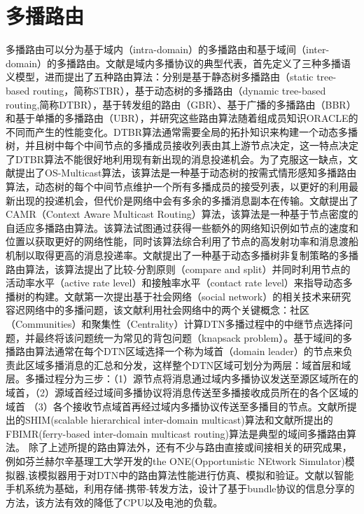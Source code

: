\section{多播路由}
多播路由可以分为基于域内（intra-domain）的多播路由和基于域间（inter-domain）的多播路由。文献\cite{Zhao2005a}是域内多播协议的典型代表，首先定义了三种多播语义模型，进而提出了五种路由算法：分别是基于静态树多播路由（static tree-based routing，简称STBR），基于动态树的多播路由（dynamic tree-based routing,简称DTBR），基于转发组的路由（GBR）、基于广播的多播路由（BBR）和基于单播的多播路由（UBR），并研究这些路由算法随着组成员知识ORACLE的不同而产生的性能变化。DTBR算法通常需要全局的拓扑知识来构建一个动态多播树，并且树中每个中间节点的多播成员接收列表由其上游节点决定，这一特点决定了DTBR算法不能很好地利用现有新出现的消息投递机会。为了克服这一缺点，文献\cite{Ye2006}提出了OS-Multicast算法，该算法是一种基于动态树的按需式情形感知多播路由算法，动态树的每个中间节点维护一个所有多播成员的接受列表，以更好的利用最新出现的投递机会，但代价是网络中会有多余的多播消息副本在传输。文献\cite{Chuah2009}提出了CAMR（Context Aware Multicast Routing）算法，该算法是一种基于节点密度的自适应多播路由算法。该算法试图通过获得一些额外的网络知识例如节点的速度和位置以获取更好的网络性能，同时该算法综合利用了节点的高发射功率和消息渡船机制以取得更高的消息投递率。文献\cite{Wang:2012up}提出了一种基于动态多播树非复制策略的多播路由算法，该算法提出了比较-分割原则（compare and split）并同时利用节点的活动率水平（active rate level）和接触率水平（contact rate level）来指导动态多播树的构建。文献\cite{Gao:2009wf}第一次提出基于社会网络（social network）的相关技术来研究容迟网络中的多播问题，该文献利用社会网络中的两个关键概念：社区（Communities）和聚集性（Centrality）计算DTN多播过程中的中继节点选择问题，并最终将该问题统一为常见的背包问题（knapsack problem）。基于域间的多播路由算法通常在每个DTN区域选择一个称为域首（domain leader）的节点来负责此区域多播消息的汇总和分发，这样整个DTN区域可划分为两层：域首层和域层。多播过程分为三步：（1）源节点将消息通过域内多播协议发送至源区域所在的域首，（2）源域首经过域间多播协议将消息传送至多播接收成员所在的各个区域的域首 （3）各个接收节点域首再经过域内多播协议传送至多播目的节点。文献\cite{Ye:2007cf}所提出的SHIM(scalable hierarchical inter-domain multicast)算法和文献\cite{Yang:2008hn}所提出的FBIMR(ferry-based inter-domain multicast routing)算法是典型的域间多播路由算法。
除了上述所提的路由算法外，还有不少与路由直接或间接相关的研究成果，例如芬兰赫尔辛基理工大学开发的the ONE(Opportunistic NEtwork Simulator)模拟器\cite{Keranen2009},该模拟器用于对DTN中的路由算法性能进行仿真、模拟和验证。文献\cite{Talipov2013}以智能手机系统为基础，利用存储-携带-转发方法，设计了基于bundle协议的信息分享的方法，该方法有效的降低了CPU以及电池的负载。

